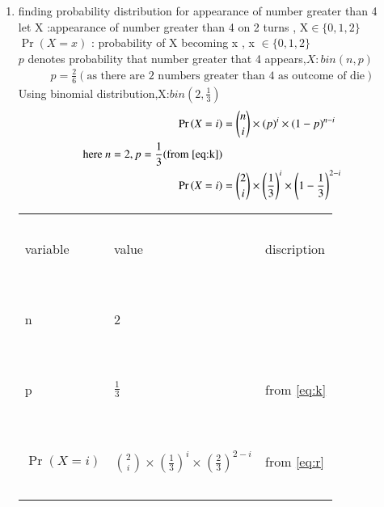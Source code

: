 \documentclass[journal,12pt,onecolumn]{IEEEtran}
\providecommand{\pr}[1]{\ensuremath{\Pr\left(#1\right)}}
\providecommand{\brak}[1]{\ensuremath{\left(#1\right)}}
\theoremstyle{remark}
\begin{document}
\begin{enumerate}
\item finding probability distribution for appearance of number greater than 4\\
let X :appearance of number greater than 4 on 2 turns , X$\in \{0,1,2\}$\\
$\pr{X=x}$ : probability of X becoming x , x $\in \{ 0,1,2 \}$\\
$p$ denotes probability that number greater that 4 appears,$X:bin(n,p)$ 
\begin{align}
p=\frac{2}{6}(\text{as there are 2 numbers greater than  4 as outcome of die})\label{eq:k} 
\end{align}
Using binomial distribution,X:$bin(2,\frac{1}{3})$
\begin{align}
\pr{X=i}&={n \choose i}\times(p)^i\times(1-p)^{n-i}\\
\text{here } n=2,p=\frac{1}{3}  (\text{from } \eqref{eq:k})\\
\pr{X=i}&={2 \choose i}\times \brak{\frac{1}{3}}^i\times\brak{1-\frac{1}{3}}^{2-i} \label{eq:r}
\end{align}
\begin{tabular}{|l|l|l|}
\hline
\ &\ &\ \\
\large variable & \large value & \large discription\\
\ & \ & \ \\
\hline
\ &\ &\  \\
\large {n} & \large{2} & \\
\ & \ & \   \\
\hline
\ & \ & \   \\
\large {p} & \large$\frac{1}{3}$ & from \eqref{eq:k}\\
\ & \ & \   \\
\hline
\ & \ & \   \\
\large {$\pr{X=i}$} & \large${2 \choose i}\times \brak{\frac{1}{3}}^i\times\brak{\frac{2}{3}}^{2-i}$ & from \eqref{eq:r}\\
\ & \ & \ \\
\hline
\end{tabular}
\vspace{2mm}\\
\begin{enumerate}



\end{enumerate}
\end{enumerate}
\end{document}
